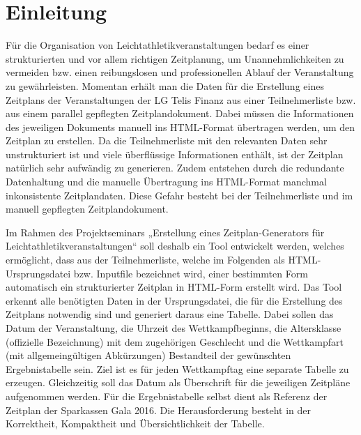 
\chapter{Einleitung}
\label{chap:Einleitung}

Für die Organisation von Leichtathletikveranstaltungen bedarf es einer strukturierten und vor allem richtigen Zeitplanung, um Unannehmlichkeiten zu vermeiden bzw. einen reibungslosen und professionellen Ablauf der Veranstaltung zu gewährleisten. Momentan erhält man die Daten für die Erstellung eines Zeitplans der Veranstaltungen der LG Telis Finanz aus einer Teilnehmerliste bzw. aus einem parallel gepflegten Zeitplandokument. Dabei müssen die Informationen des jeweiligen Dokuments manuell ins \ac{HTML}-Format übertragen werden, um den Zeitplan zu erstellen. Da die Teilnehmerliste mit den relevanten Daten sehr unstrukturiert ist und viele überflüssige Informationen enthält, ist der Zeitplan natürlich sehr aufwändig zu generieren. Zudem entstehen durch die redundante Datenhaltung und die manuelle Übertragung ins HTML-Format manchmal inkonsistente Zeitplandaten. Diese Gefahr besteht bei der Teilnehmerliste und im manuell gepflegten Zeitplandokument. 

Im Rahmen des Projektseminars „Erstellung eines Zeitplan-Generators für Leichtathletikveranstaltungen“ soll deshalb ein Tool entwickelt werden, welches ermöglicht, dass aus der Teilnehmerliste, welche im Folgenden als \ac{HTML}-Ursprungsdatei bzw. Inputfile bezeichnet wird, einer bestimmten Form automatisch ein strukturierter Zeitplan in HTML-Form erstellt wird. Das Tool erkennt alle benötigten Daten in der Ursprungsdatei, die für die Erstellung des Zeitplans notwendig sind und generiert daraus eine Tabelle. Dabei sollen das Datum der Veranstaltung, die Uhrzeit des Wettkampfbeginns, die Altersklasse (offizielle Bezeichnung) mit dem zugehörigen Geschlecht und die Wettkampfart (mit allgemeingültigen Abkürzungen) Bestandteil der gewünschten Ergebnistabelle sein. Ziel ist es für jeden Wettkampftag eine separate Tabelle zu erzeugen. Gleichzeitig soll das Datum als Überschrift für die jeweiligen Zeitpläne aufgenommen werden. Für die Ergebnistabelle selbst dient als Referenz der Zeitplan der Sparkassen Gala 2016.
Die Herausforderung besteht in der Korrektheit, Kompaktheit und Übersichtlichkeit der Tabelle.

